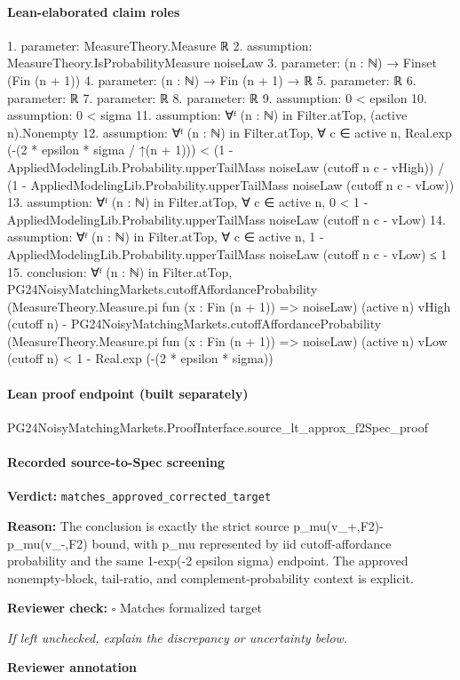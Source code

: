 \documentclass[10pt]{article}
\newcommand{\reviewerbox}{%
  \par\noindent\fbox{\parbox{0.96\linewidth}{\rule{0pt}{0.38in}}}\par
}
\newcommand{\reviewmatch}[1]{%
  \par\noindent\textbf{Reviewer check:} $\square$\; #1\par
  \noindent\emph{If left unchecked, explain the discrepancy or uncertainty below.}\par
}
\begin{document}
\paragraph{Lean-elaborated claim roles}\begin{ReviewVerbatim}
1. parameter: MeasureTheory.Measure ℝ
2. assumption: MeasureTheory.IsProbabilityMeasure noiseLaw
3. parameter: (n : ℕ) → Finset (Fin (n + 1))
4. parameter: (n : ℕ) → Fin (n + 1) → ℝ
5. parameter: ℝ
6. parameter: ℝ
7. parameter: ℝ
8. parameter: ℝ
9. assumption: 0 < epsilon
10. assumption: 0 < sigma
11. assumption: ∀ᶠ (n : ℕ) in Filter.atTop, (active n).Nonempty
12. assumption: ∀ᶠ (n : ℕ) in Filter.atTop,
  ∀ c ∈ active n,
    Real.exp (-(2 * epsilon * sigma / ↑(n + 1))) <
      (1 - AppliedModelingLib.Probability.upperTailMass noiseLaw (cutoff n c - vHigh)) /
        (1 - AppliedModelingLib.Probability.upperTailMass noiseLaw (cutoff n c - vLow))
13. assumption: ∀ᶠ (n : ℕ) in Filter.atTop,
  ∀ c ∈ active n, 0 < 1 - AppliedModelingLib.Probability.upperTailMass noiseLaw (cutoff n c - vLow)
14. assumption: ∀ᶠ (n : ℕ) in Filter.atTop,
  ∀ c ∈ active n, 1 - AppliedModelingLib.Probability.upperTailMass noiseLaw (cutoff n c - vLow) ≤ 1
15. conclusion: ∀ᶠ (n : ℕ) in Filter.atTop,
  PG24NoisyMatchingMarkets.cutoffAffordanceProbability (MeasureTheory.Measure.pi fun (x : Fin (n + 1)) => noiseLaw)
        (active n) vHigh (cutoff n) -
      PG24NoisyMatchingMarkets.cutoffAffordanceProbability (MeasureTheory.Measure.pi fun (x : Fin (n + 1)) => noiseLaw)
        (active n) vLow (cutoff n) <
    1 - Real.exp (-(2 * epsilon * sigma))
\end{ReviewVerbatim}

\paragraph{Lean proof endpoint (built separately)}\begin{ReviewVerbatim}
PG24NoisyMatchingMarkets.ProofInterface.source_lt_approx_f2Spec_proof
\end{ReviewVerbatim}

\paragraph{Recorded source-to-Spec screening}
\textbf{Verdict:} \texttt{matches\_approved\_corrected\_target}
\\
{\raggedright
\textbf{Reason:} The conclusion is exactly the strict source p\_\allowbreak{}mu(v\_\allowbreak{}+,F2)-\allowbreak{}p\_\allowbreak{}mu(v\_\allowbreak{}-\allowbreak{},F2) bound, with p\_\allowbreak{}mu represented by iid cutoff-\allowbreak{}affordance probability and the same 1-\allowbreak{}exp(-\allowbreak{}2 epsilon sigma) endpoint.\allowbreak{} The approved nonempty-\allowbreak{}block, tail-\allowbreak{}ratio, and complement-\allowbreak{}probability context is explicit.\allowbreak{}
\par}
\reviewmatch{Matches formalized target}
\noindent\textbf{Reviewer annotation}\par
\reviewerbox
\clearpage
\hypertarget{source-claim-4b0c97696721fa81}{}
\end{document}
